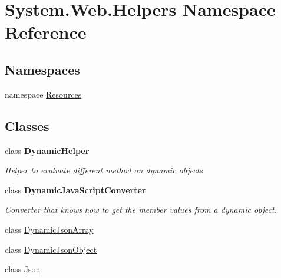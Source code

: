\hypertarget{namespaceSystem_1_1Web_1_1Helpers}{}\section{System.\+Web.\+Helpers Namespace Reference}
\label{namespaceSystem_1_1Web_1_1Helpers}
\subsection*{Namespaces}
\begin{DoxyCompactItemize}
\item 
namespace \hyperlink{namespaceSystem_1_1Web_1_1Helpers_1_1Resources}{Resources}
\end{DoxyCompactItemize}
\subsection*{Classes}
\begin{DoxyCompactItemize}
\item 
class {\bfseries Dynamic\+Helper}
\begin{DoxyCompactList}\small\item\em Helper to evaluate different method on dynamic objects \end{DoxyCompactList}\item 
class {\bfseries Dynamic\+Java\+Script\+Converter}
\begin{DoxyCompactList}\small\item\em Converter that knows how to get the member values from a dynamic object. \end{DoxyCompactList}\item 
class \hyperlink{classSystem_1_1Web_1_1Helpers_1_1DynamicJsonArray}{Dynamic\+Json\+Array}
\item 
class \hyperlink{classSystem_1_1Web_1_1Helpers_1_1DynamicJsonObject}{Dynamic\+Json\+Object}
\item 
class \hyperlink{classSystem_1_1Web_1_1Helpers_1_1Json}{Json}
\end{DoxyCompactItemize}
